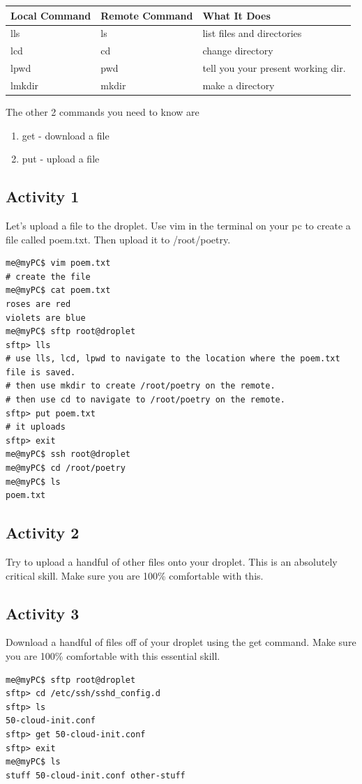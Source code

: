 \documentclass[12pt]{article}
\begin{document}
\begin{tabular}{l l l}  %
Local Command & Remote Command  & What It Does\\
\hline
lls & ls & list files and directories\\
lcd & cd  & change directory\\
lpwd & pwd & tell you your present working dir.\\
lmkdir & mkdir & make a directory
\end{tabular}

The other 2 commands you need to know are 
\begin{enumerate}
\item get - download a file
\item put - upload a file
\end{enumerate}

\subsection{Activity 1}
Let's upload a file to the droplet. Use vim in the terminal on your pc to create a file called poem.txt. Then upload it to /root/poetry.

\begin{lstlisting}[style=term]
me@myPC$ vim poem.txt
# create the file
me@myPC$ cat poem.txt
roses are red
violets are blue
me@myPC$ sftp root@droplet
sftp> lls
# use lls, lcd, lpwd to navigate to the location where the poem.txt file is saved.
# then use mkdir to create /root/poetry on the remote.
# then use cd to navigate to /root/poetry on the remote.
sftp> put poem.txt
# it uploads
sftp> exit
me@myPC$ ssh root@droplet
me@myPC$ cd /root/poetry
me@myPC$ ls
poem.txt
\end{lstlisting}

\subsection{Activity 2}
Try to upload a handful of other files onto your droplet. This is an absolutely critical skill. Make sure you are 100\% comfortable with this.

\subsection{Activity 3}
Download a handful of files off of your droplet using the get command. Make sure you are 100\% comfortable with this essential skill.

\begin{lstlisting}[style=term]
me@myPC$ sftp root@droplet
sftp> cd /etc/ssh/sshd_config.d
sftp> ls
50-cloud-init.conf
sftp> get 50-cloud-init.conf
sftp> exit
me@myPC$ ls
stuff 50-cloud-init.conf other-stuff
\end{lstlisting}
\end{document}
